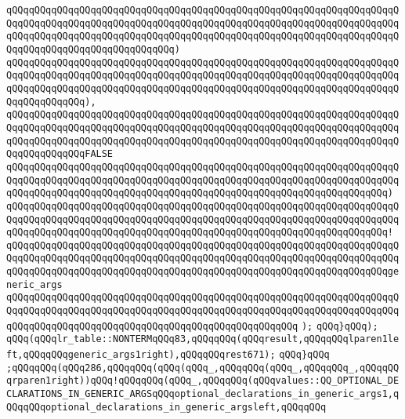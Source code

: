 \verb|qQQqqQQqqQQqqQQqqQQqqQQqqQQqqQQqqQQqqQQqqQQqqQQqqQQqqQQqqQQqqQQqqQQqqQQqqQQqqQQqqQQqqQQqqQQqqQQqqQQqqQQqqQQqqQQqqQQqqQQqqQQqqQQqqQQqqQQqqQQqqQQqqQQqqQQqqQQqqQQqqQQqqQQqqQQqqQQqqQQqqQQqqQQqqQQqqQQqqQQqqQQqqQQqqQQqqQQqqQQqqQQqqQQqqQQqqQQqqQQq)|\newline
\verb|qQQqqQQqqQQqqQQqqQQqqQQqqQQqqQQqqQQqqQQqqQQqqQQqqQQqqQQqqQQqqQQqqQQqqQQqqQQqqQQqqQQqqQQqqQQqqQQqqQQqqQQqqQQqqQQqqQQqqQQqqQQqqQQqqQQqqQQqqQQqqQQqqQQqqQQqqQQqqQQqqQQqqQQqqQQqqQQqqQQqqQQqqQQqqQQqqQQqqQQqqQQqqQQqqQQqqQQqqQQqqQQq),|\newline
\verb|qQQqqQQqqQQqqQQqqQQqqQQqqQQqqQQqqQQqqQQqqQQqqQQqqQQqqQQqqQQqqQQqqQQqqQQqqQQqqQQqqQQqqQQqqQQqqQQqqQQqqQQqqQQqqQQqqQQqqQQqqQQqqQQqqQQqqQQqqQQqqQQqqQQqqQQqqQQqqQQqqQQqqQQqqQQqqQQqqQQqqQQqqQQqqQQqqQQqqQQqqQQqqQQqqQQqqQQqqQQqqQQqFALSE|\newline
\verb|qQQqqQQqqQQqqQQqqQQqqQQqqQQqqQQqqQQqqQQqqQQqqQQqqQQqqQQqqQQqqQQqqQQqqQQqqQQqqQQqqQQqqQQqqQQqqQQqqQQqqQQqqQQqqQQqqQQqqQQqqQQqqQQqqQQqqQQqqQQqqQQqqQQqqQQqqQQqqQQqqQQqqQQqqQQqqQQqqQQqqQQqqQQqqQQqqQQqqQQqqQQqqQQq)|\newline
\verb|qQQqqQQqqQQqqQQqqQQqqQQqqQQqqQQqqQQqqQQqqQQqqQQqqQQqqQQqqQQqqQQqqQQqqQQqqQQqqQQqqQQqqQQqqQQqqQQqqQQqqQQqqQQqqQQqqQQqqQQqqQQqqQQqqQQqqQQqqQQqqQQqqQQqqQQqqQQqqQQqqQQqqQQqqQQqqQQqqQQqqQQqqQQqqQQqqQQqqQQqqQQqqQQq!|\newline
\verb|qQQqqQQqqQQqqQQqqQQqqQQqqQQqqQQqqQQqqQQqqQQqqQQqqQQqqQQqqQQqqQQqqQQqqQQqqQQqqQQqqQQqqQQqqQQqqQQqqQQqqQQqqQQqqQQqqQQqqQQqqQQqqQQqqQQqqQQqqQQqqQQqqQQqqQQqqQQqqQQqqQQqqQQqqQQqqQQqqQQqqQQqqQQqqQQqqQQqqQQqqQQqqQQqgeneric_args|\newline
\verb|qQQqqQQqqQQqqQQqqQQqqQQqqQQqqQQqqQQqqQQqqQQqqQQqqQQqqQQqqQQqqQQqqQQqqQQqqQQqqQQqqQQqqQQqqQQqqQQqqQQqqQQqqQQqqQQqqQQqqQQqqQQqqQQqqQQqqQQqqQQqqQQqqQQqqQQqqQQqqQQqqQQqqQQqqQQqqQQqqQQqqQQqqQQqqQQq|\newline
\verb|);|\newline
\verb|qQQq}qQQq);|\newline
\verb|qQQq(qQQqlr_table::NONTERMqQQq83,qQQqqQQq(qQQqresult,qQQqqQQqlparen1left,qQQqqQQqgeneric_args1right),qQQqqQQqrest671);|\newline
\verb|qQQq}qQQq|\newline
\verb|;qQQqqQQq(qQQq286,qQQqqQQq(qQQq(qQQq_,qQQqqQQq(qQQq_,qQQqqQQq_,qQQqqQQqrparen1right))qQQq!qQQqqQQq(qQQq_,qQQqqQQq(qQQqvalues::QQ_OPTIONAL_DECLARATIONS_IN_GENERIC_ARGSqQQqoptional_declarations_in_generic_args1,qQQqqQQqoptional_declarations_in_generic_argsleft,qQQqqQQq|\newline
